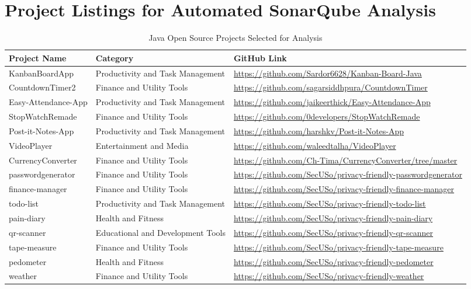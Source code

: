 
\section{Project Listings for Automated SonarQube Analysis} \label{app:a}
\begin{table}[htbp]
	\begin{tabular}{p{3cm}|p{5cm}|p{7cm}}
		\hline
		\cellcolor{Gray}Project Name & \cellcolor{Gray}Category	                                                  & \cellcolor{Gray}GitHub Link  \\ \hline
        KanbanBoardApp & Productivity and Task Management & \url{https://github.com/Sardor6628/Kanban-Board-Java} \\
        CountdownTimer2 & Finance and Utility Tools & \url{https://github.com/sagarsiddhpura/CountdownTimer} \\
        Easy-Attendance-App & Productivity and Task Management & \url{https://github.com/jaikeerthick/Easy-Attendance-App} \\
        StopWatchRemade & Finance and Utility Tools & \url{https://github.com/0developers/StopWatchRemade} \\
        Post-it-Notes-App & Productivity and Task Management & \url{https://github.com/harshkv/Post-it-Notes-App} \\
        VideoPlayer & Entertainment and Media & \url{https://github.com/waleedtalha/VideoPlayer} \\
        CurrencyConverter & Finance and Utility Tools & \url{https://github.com/Ch-Tima/CurrencyConverter/tree/master} \\
        passwordgenerator & Finance and Utility Tools & \url{https://github.com/SecUSo/privacy-friendly-passwordgenerator} \\
        finance-manager & Finance and Utility Tools & \url{https://github.com/SecUSo/privacy-friendly-finance-manager} \\
        todo-list & Productivity and Task Management & \url{https://github.com/SecUSo/privacy-friendly-todo-list} \\
        pain-diary & Health and Fitness & \url{https://github.com/SecUSo/privacy-friendly-pain-diary} \\
        qr-scanner & Educational and Development Tools & \url{https://github.com/SecUSo/privacy-friendly-qr-scanner} \\
        tape-measure & Finance and Utility Tools & \url{https://github.com/SecUSo/privacy-friendly-tape-measure} \\
        pedometer & Health and Fitness & \url{https://github.com/SecUSo/privacy-friendly-pedometer} \\
        weather & Finance and Utility Tools & \url{https://github.com/SecUSo/privacy-friendly-weather} \\
 
    \end{tabular}
	\caption{ Java Open Source Projects Selected for Analysis \label{tab:java_projects}}
\end{table}

